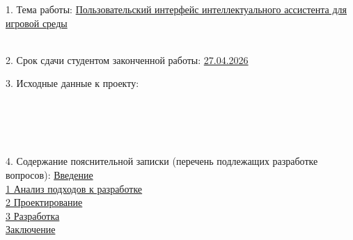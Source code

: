 {\begin{center}
  \end{center}

  1. Тема работы: \uline{Пользовательский интерфейс интеллектуального ассистента для игровой среды}\lineunderscore\\
  \lineunderscore\\
  \vspace{1em}

  2. Срок сдачи студентом законченной работы: \uline{27.04.2026}\lineunderscore

  \vspace{1em}

  3. Исходные данные к проекту: 
  \lineunderscore\\
  \lineunderscore\\
  \lineunderscore\\
  \lineunderscore\\
  \lineunderscore\\
  \lineunderscore
  \uline{\hspace*{4ex}
}\lineunderscore

  \vspace{1em}

  4. Содержание пояснительной записки (перечень подлежащих разработке вопросов):
  \uline{\hspace*{2ex}Введение}\lineunderscore\\
  \uline{\hspace*{2ex}1 Анализ подходов к разработке}\lineunderscore\\
  \uline{\hspace*{2ex}2 Проектирование}\lineunderscore\\
  \uline{\hspace*{2ex}3 Разработка}\lineunderscore\\
  \uline{\hspace*{2ex}Заключение}\lineunderscore\\
  \lineunderscore\\
  \lineunderscore\\
  \lineunderscore\\
  \lineunderscore\\
  \lineunderscore\\
  \lineunderscore\\
  \lineunderscore

}
